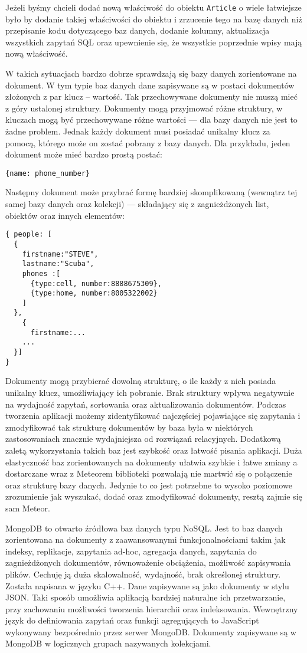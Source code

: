 Jeżeli byśmy chcieli dodać nową właściwość do obiektu \verb|Article| o wiele łatwiejsze było by dodanie takiej właściwości do obiektu i zrzucenie tego na bazę danych niż przepisanie kodu dotyczącego baz danych, dodanie kolumny, aktualizacja wszystkich zapytań SQL oraz upewnienie się, że wszystkie poprzednie wpisy mają nową właściwość. 

W takich sytuacjach bardzo dobrze sprawdzają się bazy danych zorientowane na dokument. W tym typie baz danych dane zapisywane są w postaci dokumentów złożonych z par klucz -- wartość. Tak przechowywane dokumenty nie muszą mieć z góry ustalonej struktury. Dokumenty mogą przyjmować różne struktury, w kluczach mogą być przechowywane różne wartości --- dla bazy danych nie jest to żadne problem. Jednak każdy dokument musi posiadać unikalny klucz za pomocą, którego może on zostać pobrany z bazy danych\cite{strack15}.
Dla przykładu, jeden dokument może mieć bardzo prostą postać:
\begin{verbatim}
{name: phone_number}
\end{verbatim}
Następny dokument może przybrać formę bardziej skomplikowaną (wewnątrz tej samej bazy danych oraz kolekcji) --- składający się z zagnieżdżonych list, obiektów oraz innych elementów\cite{strack15}:
\begin{verbatim}
{ people: [
  {
    firstname:"STEVE", 
    lastname:"Scuba", 
    phones :[
      {type:cell, number:8888675309},
      {type:home, number:8005322002}
    ]
  },
    {
      firstname:...
	...
  }]
}
\end{verbatim}
Dokumenty mogą przybierać dowolną strukturę, o ile każdy z nich posiada unikalny klucz, umożliwiający ich pobranie. Brak struktury wpływa negatywnie na wydajność zapytań, sortowania oraz aktualizowania dokumentów. Podczas tworzenia aplikacji możemy zidentyfikować najczęściej pojawiające się zapytania i zmodyfikować tak strukturę dokumentów by baza była w niektórych zastosowaniach znacznie wydajniejsza od rozwiązań relacyjnych. Dodatkową zaletą wykorzystania takich baz jest szybkość oraz łatwość pisania aplikacji\cite{strack15}.
Duża elastyczność baz zorientowanych na dokumenty ułatwia szybkie i łatwe zmiany a dostarczane wraz z Meteorem biblioteki pozwalają nie martwić się o połączenie oraz strukturę bazy danych. Jedynie to co jest potrzebne to wysoko poziomowe zrozumienie jak wyszukać, dodać oraz zmodyfikować dokumenty, resztą zajmie się sam Meteor.

MongoDB to otwarto źródłowa baz danych typu NoSQL. Jest to baz danych zorientowana na dokumenty z zaawansowanymi funkcjonalnościami takim jak indeksy, replikacje, zapytania ad-hoc, agregacja danych, zapytania do zagnieżdżonych dokumentów, równoważenie obciążenia, możliwość zapisywania plików. Cechuję ją duża skalowalność, wydajność, brak określonej struktury. Została napisana w języku C++. Dane zapisywane są jako dokumenty w stylu JSON. Taki sposób umożliwia aplikacją bardziej naturalne ich przetwarzanie, przy zachowaniu możliwości tworzenia hierarchii oraz indeksowania. Wewnętrzny język do definiowania zapytań oraz funkcji agregujących to JavaScript wykonywany bezpośrednio przez serwer MongoDB. Dokumenty zapisywane są w MongoDB w logicznych grupach nazywanych kolekcjami.

